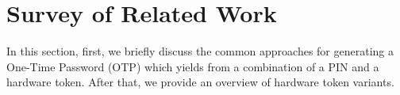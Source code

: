 

\section{Survey of Related Work}\label{Survey-of-Related-Work}





%
%
%


In this section, first, we briefly discuss the common approaches for generating a One-Time Password (OTP) which yields from a combination of a PIN and a hardware token.  After that, we provide an overview of hardware token variants. 


